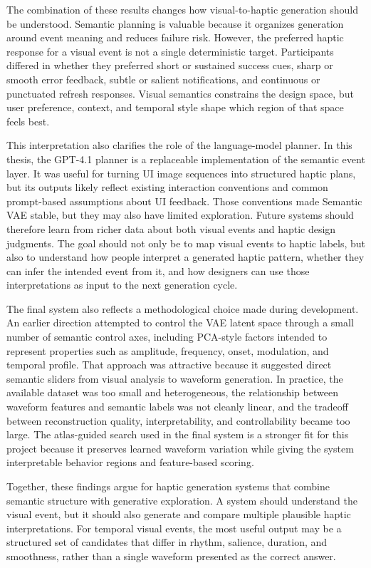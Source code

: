 The combination of these results changes how visual-to-haptic generation should be understood. Semantic planning is valuable because it organizes generation around event meaning and reduces failure risk. However, the preferred haptic response for a visual event is not a single deterministic target. Participants differed in whether they preferred short or sustained success cues, sharp or smooth error feedback, subtle or salient notifications, and continuous or punctuated refresh responses. Visual semantics constrains the design space, but user preference, context, and temporal style shape which region of that space feels best.

This interpretation also clarifies the role of the language-model planner. In this thesis, the GPT-4.1 planner is a replaceable implementation of the semantic event layer. It was useful for turning UI image sequences into structured haptic plans, but its outputs likely reflect existing interaction conventions and common prompt-based assumptions about UI feedback. Those conventions made Semantic VAE stable, but they may also have limited exploration. Future systems should therefore learn from richer data about both visual events and haptic design judgments. The goal should not only be to map visual events to haptic labels, but also to understand how people interpret a generated haptic pattern, whether they can infer the intended event from it, and how designers can use those interpretations as input to the next generation cycle.

The final system also reflects a methodological choice made during development. An earlier direction attempted to control the VAE latent space through a small number of semantic control axes, including PCA-style factors intended to represent properties such as amplitude, frequency, onset, modulation, and temporal profile. That approach was attractive because it suggested direct semantic sliders from visual analysis to waveform generation. In practice, the available dataset was too small and heterogeneous, the relationship between waveform features and semantic labels was not cleanly linear, and the tradeoff between reconstruction quality, interpretability, and controllability became too large. The atlas-guided search used in the final system is a stronger fit for this project because it preserves learned waveform variation while giving the system interpretable behavior regions and feature-based scoring.

Together, these findings argue for haptic generation systems that combine semantic structure with generative exploration. A system should understand the visual event, but it should also generate and compare multiple plausible haptic interpretations. For temporal visual events, the most useful output may be a structured set of candidates that differ in rhythm, salience, duration, and smoothness, rather than a single waveform presented as the correct answer.

